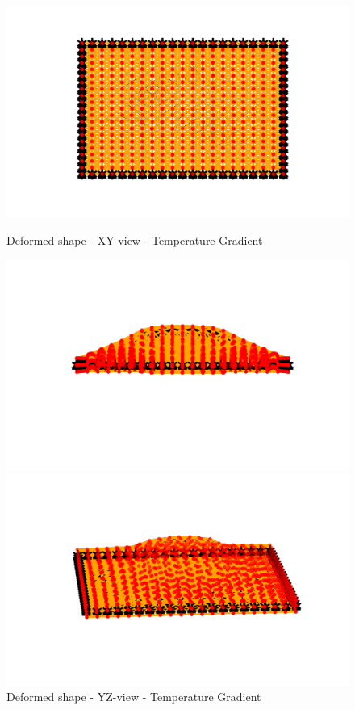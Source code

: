  \begin{figure}[!htbp]
\begin{minipage}{0.3\textwidth}
    \centering
    \includegraphics[width = 1\textwidth]{Figures/temp_grad_XY.png}
    \caption{Deformed shape - XY-view - Temperature Gradient}
    \label{fig:temp_grad_xy}
\end{minipage}
\hspace{5mm}
\begin{minipage}{0.3\textwidth}
    \centering
    \includegraphics[width = 1\textwidth]{Figures/temp_grad_YZ.png}
    \caption{Deformed shape - YZ-view - Temperature Gradient}
    \label{fig:temp_grad_yz}
\end{minipage}
\hspace{5mm}
\begin{minipage}{0.3\textwidth}
    \centering
    \includegraphics[width = 1\textwidth]{Figures/temp_grad_3D.png}

\end{minipage}
\end{figure}
